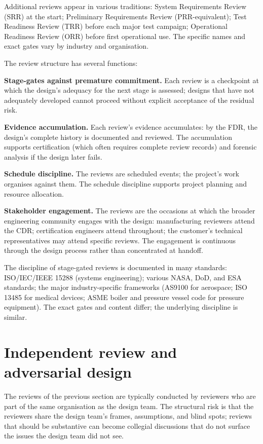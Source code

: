 Additional reviews appear in various traditions: System Requirements Review (SRR) at the start; Preliminary Requirements Review (PRR-equivalent); Test Readiness Review (TRR) before each major test campaign; Operational Readiness Review (ORR) before first operational use. The specific names and exact gates vary by industry and organisation.

The review structure has several functions:

\textbf{Stage-gates against premature commitment.} Each review is a checkpoint at which the design's adequacy for the next stage is assessed; designs that have not adequately developed cannot proceed without explicit acceptance of the residual risk.

\textbf{Evidence accumulation.} Each review's evidence accumulates: by the FDR, the design's complete history is documented and reviewed. The accumulation supports certification (which often requires complete review records) and forensic analysis if the design later fails.

\textbf{Schedule discipline.} The reviews are scheduled events; the project's work organises against them. The schedule discipline supports project planning and resource allocation.

\textbf{Stakeholder engagement.} The reviews are the occasions at which the broader engineering community engages with the design: manufacturing reviewers attend the CDR; certification engineers attend throughout; the customer's technical representatives may attend specific reviews. The engagement is continuous through the design process rather than concentrated at handoff.

The discipline of stage-gated reviews is documented in many standards: ISO/IEC/IEEE 15288 (systems engineering); various NASA, DoD, and ESA standards; the major industry-specific frameworks (AS9100 for aerospace; ISO 13485 for medical devices; ASME boiler and pressure vessel code for pressure equipment). The exact gates and content differ; the underlying discipline is similar.

\section{Independent review and adversarial design}

The reviews of the previous section are typically conducted by reviewers who are part of the same organisation as the design team. The structural risk is that the reviewers share the design team's frames, assumptions, and blind spots; reviews that should be substantive can become collegial discussions that do not surface the issues the design team did not see.


